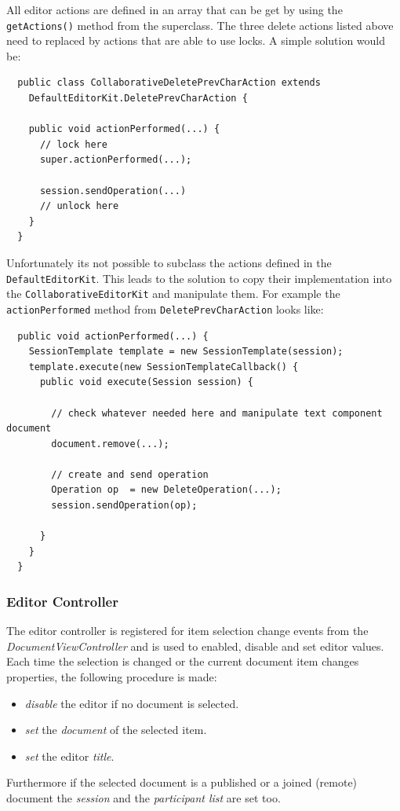 All editor actions are defined in an array that can be get by using the \texttt{getActions()} method from the superclass. The three delete actions listed above need to replaced by actions that are able to use locks. A simple solution would be:
\begin{verbatim}
  public class CollaborativeDeletePrevCharAction extends
    DefaultEditorKit.DeletePrevCharAction {
    
    public void actionPerformed(...) {
      // lock here
      super.actionPerformed(...);
      
      session.sendOperation(...)
      // unlock here
    }
  }
\end{verbatim}
Unfortunately its not possible to subclass the actions defined in the \texttt{DefaultEditorKit}. This leads to the solution to copy their implementation into the \texttt{CollaborativeEditorKit} and manipulate them. For example the \texttt{actionPerformed} method from \texttt{DeletePrevCharAction} looks like:
\begin{verbatim}
  public void actionPerformed(...) {
    SessionTemplate template = new SessionTemplate(session);
    template.execute(new SessionTemplateCallback() {
      public void execute(Session session) {

        // check whatever needed here and manipulate text component document
        document.remove(...);
        
        // create and send operation
        Operation op  = new DeleteOperation(...);
        session.sendOperation(op);

      }
    }
  }
\end{verbatim}


\subsubsection{Editor Controller}
The editor controller is registered for item selection change events from the \textit{DocumentViewController} and is used to enabled, disable and set editor values. Each time the selection is changed or the current document item changes properties, the following procedure is made:
\begin{itemize}
\item \textit{disable} the editor if no document is selected.
\item \textit{set} the \textit{document} of the selected item.
\item \textit{set} the editor \textit{title}.
\end{itemize}
Furthermore if the selected document is a published or a joined (remote) document the \textit{session} and the \textit{participant list} are set too.

